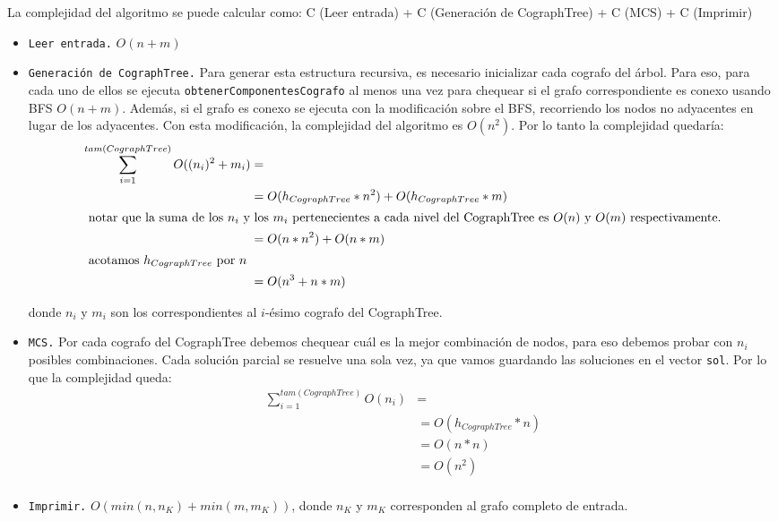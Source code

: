 La complejidad del algoritmo se puede calcular como:
C (Leer entrada) + C (Generación de CographTree) + C (MCS) + C (Imprimir)

\begin{itemize}
\item \texttt{Leer entrada.} $ O (n + m) $ 
\item \texttt{Generación de CographTree.} Para generar esta estructura recursiva, es necesario inicializar cada cografo del árbol. Para eso, para cada uno de ellos se ejecuta \texttt{obtenerComponentesCografo} al menos una vez para chequear si el grafo correspondiente es conexo usando BFS $O(n+m)$. Además, si el grafo es conexo se ejecuta con la modificación sobre el BFS, recorriendo los nodos no adyacentes en lugar de los adyacentes. Con esta modificación, la complejidad del algoritmo es $O(n^2)$. Por lo tanto la complejidad quedaría:
\begin{align*}
\sum_{i=1}^{tam(CographTree)} O ( (n_i)^2 + m_i ) & = \\
& = O ( h_{CographTree} * n^2 ) +  O ( h_{CographTree} * m ) \\
\intertext{ notar que la suma de los $n_i$ y los $m_i$ pertenecientes a cada nivel del CographTree es $O(n)$ y $O(m)$ respectivamente.}
& = O ( n * n^2 ) +  O ( n * m ) \\
\intertext{ acotamos $h_{CographTree}$ por $n$}
& = O ( n^3 + n*m )
\end{align*}

donde $n_i$ y $m_i$ son los correspondientes al $i$-ésimo cografo del CographTree.

\item \texttt{MCS.} Por cada cografo del CographTree debemos chequear cuál es la mejor combinación de nodos, para eso debemos probar con $n_i$ posibles combinaciones. Cada solución parcial se resuelve una sola vez, ya que vamos guardando las soluciones en el vector \texttt{sol}. Por lo que la complejidad queda:
\begin{align*}
\sum_{i=1}^{tam(CographTree)} O (n_i) & = \\
& = O ( h_{CographTree} * n ) \\
& = O ( n * n ) \\
& = O ( n^2 ) \\
\end{align*}

\item \texttt{Imprimir.} $O( min( n, n_K) + min (m, m_K) )$, donde $n_K$ y $m_K$ corresponden al grafo completo de entrada.
\end{itemize}

